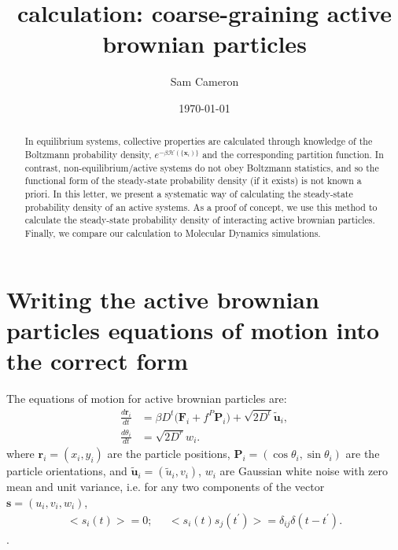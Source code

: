 \documentclass[twocolumn,amsmath,amssymb,aps]{revtex4-1}%
\begin{document}
 
\title{calculation: coarse-graining active brownian particles}
\author{Sam Cameron}
%
\date{\today}

\begin{abstract}
  In equilibrium systems, collective properties are calculated
  through knowledge of the Boltzmann probability density,
  $e^{-\beta \mathcal{H}(\{\bm{x}_i)\}}$ and the corresponding partition
  function. In contrast, non-equilibrium/active systems do not obey
  Boltzmann statistics, and so the functional form of the steady-state
  probability density (if it exists) is not known a priori. In this letter,
  we present a systematic way of calculating the steady-state
  probability density of an active systems. As a proof of concept, we use
  this method to calculate the steady-state probability density of
  interacting active brownian particles. Finally, we compare our calculation
  to Molecular Dynamics simulations.
\end{abstract}


\maketitle

\section{Writing the active brownian particles equations of motion into
  the correct form}

The equations of motion for active brownian particles are:
\begin{subequations}
  \label{eqs:basicABPsODEs}
  \begin{align}
    \frac{d\bm{r}_i}{dt}&=\beta D^t\big(\bm{F}_i
    +f^P\bm{P}_i\big)
    +\sqrt{2D^t}\tilde{\bm{u}}_i,\label{eq:micro_pos}\\
    \frac{d\theta_i}{dt}&=\sqrt{2D^r}w_i.\label{eq:micro_theta}
  \end{align}
\end{subequations}
where $\bm{r}_i=(x_i,y_i)$ are the particle positions,
$\bm{P}_i=(\cos\theta_i,\sin\theta_i)$ are the particle orientations,
and $\tilde{\bm{u}}_i=(\tilde{u}_i,v_i)$, $w_i$ are Gaussian white noise
with zero mean and unit variance, i.e. for any two components of the vector
$\bm{s}=(u_i,v_i,w_i)$,
\begin{align}
  \big<s_i(t)\big>=0;\;\;\;\;\; \big<s_i(t)s_j(t^{\prime})\big>=
  \delta_{ij}\delta(t-t^{\prime}).
\end{align}.
\end{document}
